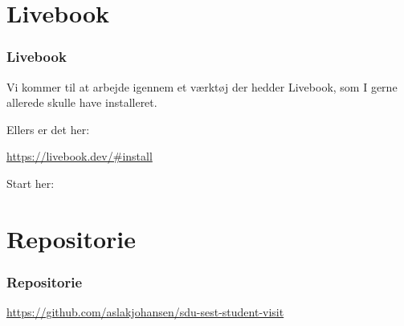 \section{Livebook}
\begin{frame}
    \frametitle{Livebook}
    \vspace{5mm}
    Vi kommer til at arbejde igennem et værktøj der hedder Livebook, som I gerne allerede skulle have installeret.
    
    \vspace{7mm}
    Ellers er det her:
    \begin{center}
      \url{https://livebook.dev/\#install}
    \end{center}
    
    \vspace{7mm}
    Start her:
    \begin{center}
    \end{center}
\end{frame}

\section{Repositorie}
\begin{frame}
    \frametitle{Repositorie}
    \begin{center}
      \url{https://github.com/aslakjohansen/sdu-sest-student-visit}
    \end{center}
\end{frame}



